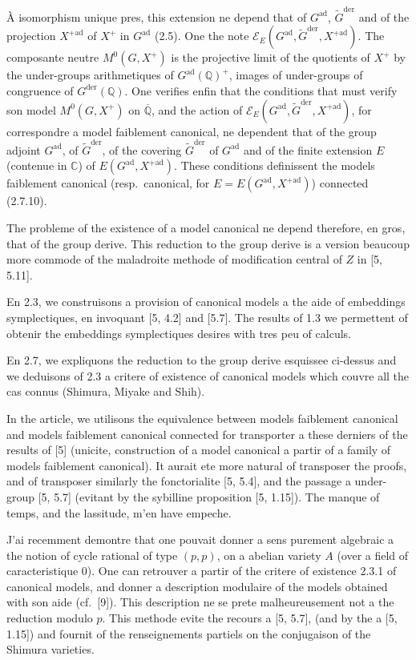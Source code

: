 \documentclass[12pt,a4paper]{article}
\theoremstyle{plain}
\theoremstyle{definition}
\theoremstyle{remark}
\newcommand{\QQ}{\mathbb{Q}}
\newcommand{\CC}{\mathbb{C}}
\begin{document}
\`A isomorphism unique pres, this extension ne depend that of $G^{\text{ad}}$, $\tilde{G}^{\text{der}}$ and of the projection $X^{+\text{ad}}$ of $X^+$ in $G^{\text{ad}}$ (2.5). One the note $\mathscr{E}_E(G^{\text{ad}},\tilde{G}^{\text{der}},X^{+\text{ad}})$. The composante neutre $M^0(G,X^+)$ is the projective limit of the quotients of $X^+$ by the under-groups arithmetiques of $G^{\text{ad}}(\QQ)^+$, images of under-groups of congruence of $G^{\text{der}}(\QQ)$. One verifies enfin that the conditions that must verify son model $M^0(G,X^+)$ on $\overline{\QQ}$, and the action of $\mathscr{E}_E(G^{\text{ad}},\tilde{G}^{\text{der}},X^{+\text{ad}})$, for correspondre a model faiblement canonical, ne dependent that of the group adjoint $G^{\text{ad}}$, of $\tilde{G}^{\text{der}}$, of the covering $\tilde{G}^{\text{der}}$ of $G^{\text{ad}}$ and of the finite extension $E$ (contenue in $\CC$) of $E(G^{\text{ad}},X^{+\text{ad}})$. These conditions definissent the models faiblement canonical (resp.~canonical, for $E = E(G^{\text{ad}},X^{+\text{ad}})$) connected (2.7.10).

The probleme of the existence of a model canonical ne depend therefore, en gros, that of the group derive. This reduction to the group derive is a version beaucoup more commode of the maladroite methode of modification central of $Z$ in [5, 5.11].

En 2.3, we construisons a provision of canonical models a the aide of embeddings symplectiques, en invoquant [5, 4.2] and [5.7]. The results of 1.3 we permettent of obtenir the embeddings symplectiques desires with tres peu of calculs.

En 2.7, we expliquons the reduction to the group derive esquissee ci-dessus and we deduisons of 2.3 a critere of existence of canonical models which couvre all the cas connus (Shimura, Miyake and Shih).

In the article, we utilisons the equivalence between models faiblement canonical and models faiblement canonical connected for transporter a these derniers of the results of [5] (unicite, construction of a model canonical a partir of a family of models faiblement canonical). It aurait ete more natural of transposer the proofs, and of transposer similarly the fonctorialite [5, 5.4], and the passage a under-group [5, 5.7] (evitant by the sybilline proposition [5, 1.15]). The manque of temps, and the lassitude, m'en have empeche.

J'ai recemment demontre that one pouvait donner a sens purement algebraic a the notion of cycle rational of type $(p,p)$, on a abelian variety $A$ (over a field of caracteristique 0). One can retrouver a partir of the critere of existence 2.3.1 of canonical models, and donner a description modulaire of the models obtained with son aide (cf.~[9]). This description ne se prete malheureusement not a the reduction modulo $p$. This methode evite the recours a [5, 5.7], (and by the a [5, 1.15]) and fournit of the renseignements partiels on the conjugaison of the Shimura varieties.
\end{document}
